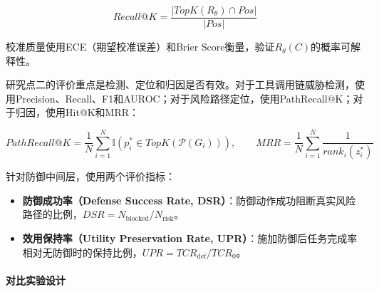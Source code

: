 \begin{equation}
  Recall@K = \frac{|TopK(R_\theta) \cap Pos|}{|Pos|}
\end{equation}

校准质量使用ECE（期望校准误差）和Brier Score衡量，验证$R_\theta(C)$的概率可解释性。

研究点二的评价重点是检测、定位和归因是否有效。对于工具调用链威胁检测，使用Precision、Recall、F1和AUROC；对于风险路径定位，使用PathRecall@K；对于归因，使用Hit@K和MRR：

\begin{equation}
  PathRecall@K = \frac{1}{N} \sum_{i=1}^{N} \mathbb{I}(p_i^* \in TopK(\mathcal{P}(G_i))), \qquad
  MRR = \frac{1}{N} \sum_{i=1}^{N} \frac{1}{rank_i(z_i^*)}
\end{equation}

针对防御中间层，使用两个评价指标：

\begin{itemize}
  \item \textbf{防御成功率（Defense Success Rate, DSR）}：防御动作成功阻断真实风险路径的比例，$DSR = N_{\text{blocked}} / N_{\text{risk}}$。
  \item \textbf{效用保持率（Utility Preservation Rate, UPR）}：施加防御后任务完成率相对无防御时的保持比例，$UPR = TCR_{\text{def}} / TCR_0$。
\end{itemize}


\paragraph{对比实验设计}


